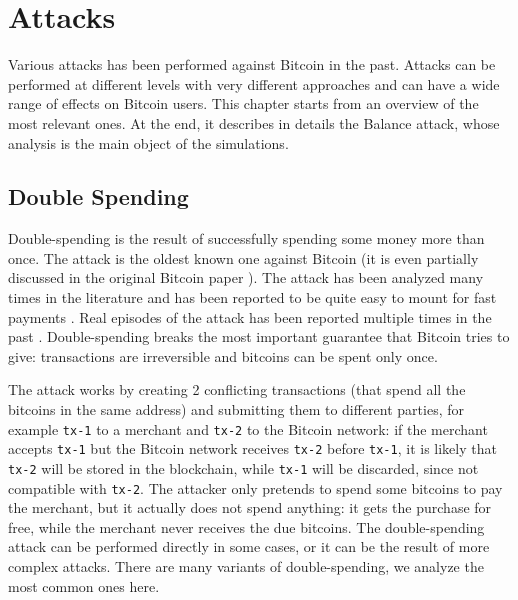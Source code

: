 \chapter{Attacks}
\label{chapter:attacks}
Various attacks has been performed against Bitcoin in the past.
Attacks can be performed at different levels with very different approaches and can have a wide range of effects on Bitcoin users.
This chapter starts from an overview of the most relevant ones.
At the end, it describes in details the Balance attack, whose analysis is the main object of the simulations.

\section{Double Spending}
\label{sec:double-spending}
Double-spending is the result of successfully spending some money more than once.
The attack is the oldest known one against Bitcoin (it is even partially discussed in the original Bitcoin paper \cite{bitcoin_2009}).
The attack has been analyzed many times in the literature \cite{double_spending_fast_payments, double_spending_two_for_one, double_spending_bitcoin_economics, double_spending_fast_analysis_2014} and has been reported to be quite easy to mount for fast payments \cite{double_spending_fast_payments}.
Real episodes of the attack has been reported multiple times in the past \cite{double_spending_ghash, double_spending_stackexchange}.
Double-spending breaks the most important guarantee that Bitcoin tries to give:
transactions are irreversible and bitcoins can be spent only once.

The attack works by creating \num{2} conflicting transactions (that spend all the bitcoins in the same address) and submitting them to different parties, for example \texttt{tx-1} to a merchant and \texttt{tx-2} to the Bitcoin network:
if the merchant accepts \texttt{tx-1} but the Bitcoin network receives \texttt{tx-2} before \texttt{tx-1}, it is likely that \texttt{tx-2} will be stored in the blockchain, while \texttt{tx-1} will be discarded, since not compatible with \texttt{tx-2}.
The attacker only pretends to spend some bitcoins to pay the merchant, but it actually does not spend anything:
it gets the purchase for free, while the merchant never receives the due bitcoins.
The double-spending attack can be performed directly in some cases, or it can be the result of more complex attacks.
There are many variants of double-spending, we analyze the most common ones here.


